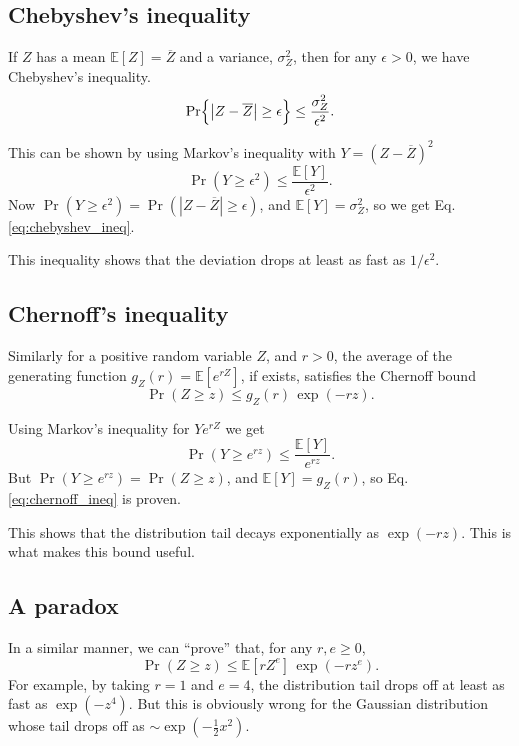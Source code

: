 \documentclass{article}
\begin{document}
\subsection{Chebyshev's inequality}

If $Z$ has a mean $\mathbb{E}[Z] = \overline Z$
and a variance, $\sigma_Z^2$, then for any $\epsilon > 0$,
we have Chebyshev's inequality.
\begin{equation}
\Pr\Bigl\{\bigl|Z - \overline Z \bigr|\ge \epsilon\Bigr\} \le \frac{\sigma_Z^2}{\epsilon^2}.
\label{eq:chebyshev_ineq}
\end{equation}

This can be shown by using Markov's inequality with $Y = (Z - \overline Z)^2$
$$
\Pr(Y \ge \epsilon^2)
\le
\frac{ \mathbb{E}[Y] } { \epsilon^2 }.
$$
Now
$\Pr(Y \ge \epsilon^2) = \Pr(|Z - \overline Z| \ge \epsilon)$,
and
$\mathbb{E}[Y] = \sigma_Z^2$,
so we get Eq. \eqref{eq:chebyshev_ineq}.

This inequality shows that the deviation drops at least as fast as $1/\epsilon^2$.


\subsection{Chernoff's inequality}

Similarly for a positive random variable $Z$, and $r > 0$, the average of
the generating function $g_Z(r) = \mathbb{E}[e^{rZ}]$, if exists, satisfies
the Chernoff bound
\begin{equation}
\Pr(Z \ge z)
\le g_Z(r) \, \exp(-rz).
\label{eq:chernoff_ineq}
\end{equation}

Using Markov's inequality for $Y e^{rZ}$ we get
$$
\Pr(Y \ge e^{rz})
\le
\frac{ \mathbb{E}[Y] } { e^{rz} }.
$$
But $\Pr(Y \ge e^{rz}) = \Pr(Z \ge z)$,
and $\mathbb{E}[Y] = g_Z(r)$, so Eq. \eqref{eq:chernoff_ineq} is proven.

This shows that the distribution tail decays exponentially as $\exp(-rz)$.
This is what makes this bound useful.


\subsection{A paradox}

In a similar manner, we can ``prove'' that, for any $r, e \ge 0$,
$$
\Pr(Z \ge z)
\le
\mathbb{E}[rZ^e] \, \exp(-rz^e).
$$
For example, by taking $r = 1$ and $e = 4$,
the distribution tail drops off at least as fast as $\exp(-z^4)$.
%
But this is obviously wrong for the Gaussian distribution
whose tail drops off as $\sim \exp\left( -\frac{1}{2} x^2 \right)$.
\end{document}
